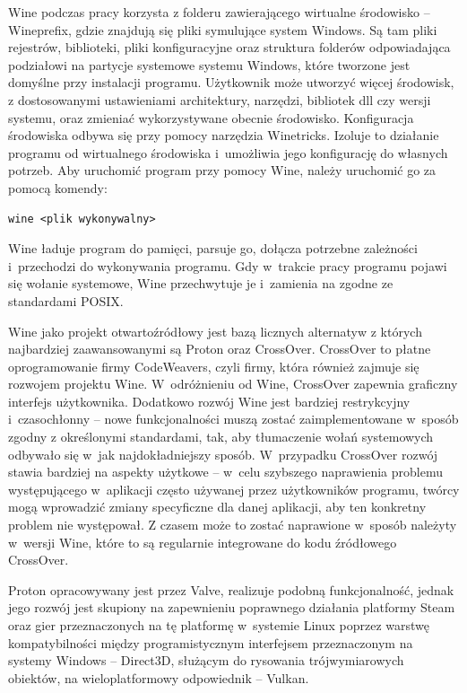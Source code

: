 Wine podczas pracy korzysta z folderu zawierającego wirtualne środowisko -- Wineprefix\cite{wineprefix}, gdzie znajdują się pliki symulujące system Windows. Są tam pliki rejestrów, biblioteki, pliki konfiguracyjne oraz struktura folderów odpowiadająca podziałowi na partycje systemowe systemu Windows, które tworzone jest domyślne przy instalacji programu. Użytkownik może utworzyć więcej środowisk, z dostosowanymi ustawieniami architektury, narzędzi, bibliotek dll czy wersji systemu, oraz zmieniać wykorzystywane obecnie środowisko. Konfiguracja środowiska odbywa się przy pomocy narzędzia Winetricks\cite{winetricks}. Izoluje to działanie programu od wirtualnego środowiska i~umożliwia jego konfigurację do własnych potrzeb. Aby uruchomić program przy pomocy Wine, należy uruchomić go za pomocą komendy:
\begin{verbatim}
wine <plik wykonywalny>
\end{verbatim} Wine ładuje program do pamięci, parsuje go, dołącza potrzebne zależności i~przechodzi do wykonywania programu. Gdy w~trakcie pracy programu pojawi się wołanie systemowe, Wine przechwytuje je i~zamienia na zgodne ze standardami POSIX. 

Wine jako projekt otwartoźródłowy jest bazą licznych alternatyw\cite{wineBasedProjects} z których najbardziej zaawansowanymi są Proton\cite{proton} oraz CrossOver\cite{crossover}. CrossOver to płatne oprogramowanie firmy CodeWeavers, czyli firmy, która również zajmuje się rozwojem projektu Wine. W~odróżnieniu od Wine, CrossOver zapewnia graficzny interfejs użytkownika. Dodatkowo rozwój Wine jest bardziej restrykcyjny i~czasochłonny -- nowe funkcjonalności muszą zostać zaimplementowane w~sposób zgodny z określonymi standardami, tak, aby tłumaczenie wołań systemowych odbywało się w~jak najdokładniejszy sposób. W~przypadku CrossOver rozwój stawia bardziej na aspekty użytkowe -- w~celu szybszego naprawienia problemu występującego w~aplikacji często używanej przez użytkowników programu, twórcy mogą wprowadzić zmiany specyficzne dla danej aplikacji, aby ten konkretny problem nie występował. Z czasem może to zostać naprawione w~sposób należyty w~wersji Wine, które to są regularnie integrowane do kodu źródłowego CrossOver.

Proton opracowywany jest przez Valve, realizuje podobną funkcjonalność, jednak jego rozwój jest skupiony na zapewnieniu poprawnego działania platformy Steam oraz gier przeznaczonych na tę platformę w~systemie Linux poprzez warstwę kompatybilności między programistycznym interfejsem przeznaczonym na systemy Windows -- Direct3D, służącym do rysowania trójwymiarowych obiektów, na wieloplatformowy odpowiednik -- Vulkan.

